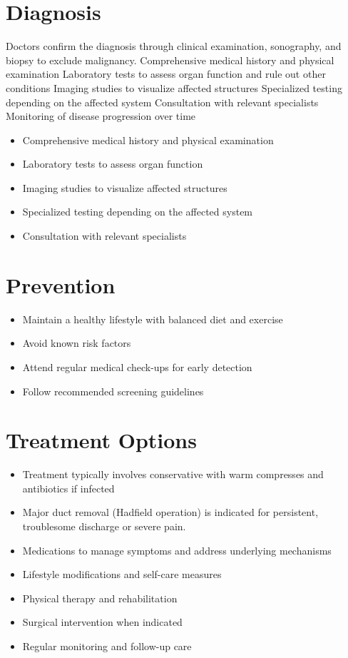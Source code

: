 \section{Diagnosis}
Doctors confirm the diagnosis through clinical examination, sonography, and biopsy to exclude malignancy. Comprehensive medical history and physical examination Laboratory tests to assess organ function and rule out other conditions Imaging studies to visualize affected structures Specialized testing depending on the affected system Consultation with relevant specialists Monitoring of disease progression over time

\begin{itemize}[noitemsep]
  \item Comprehensive medical history and physical examination
  \item Laboratory tests to assess organ function
  \item Imaging studies to visualize affected structures
  \item Specialized testing depending on the affected system
  \item Consultation with relevant specialists
\end{itemize}
\section{Prevention}
\begin{itemize}[noitemsep]
  \item Maintain a healthy lifestyle with balanced diet and exercise
  \item Avoid known risk factors
  \item Attend regular medical check-ups for early detection
  \item Follow recommended screening guidelines
\end{itemize}
\section{Treatment Options}
\begin{itemize}[noitemsep]
  \item Treatment typically involves conservative with warm compresses and antibiotics if infected
  \item Major duct removal (Hadfield operation) is indicated for persistent, troublesome discharge or severe pain.
  \item Medications to manage symptoms and address underlying mechanisms
  \item Lifestyle modifications and self-care measures
  \item Physical therapy and rehabilitation
  \item Surgical intervention when indicated
  \item Regular monitoring and follow-up care
\end{itemize}
